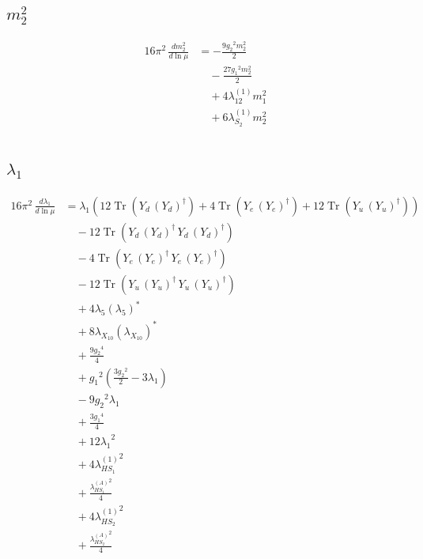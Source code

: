\documentclass[10pt,a4paper]{article}
\begin{document}
\subsection*{$m_2^2$}
\begin{align*}
16\pi^2\,\frac{d m_2^2}{d\ln\mu} &=-\frac{9 {g_2}^2 {m_2^2}}{2} \\
&\quad -\frac{27 {g_1}^2 {m_2^2}}{2} \\
&\quad +4 {\lambda_{12}^{(1)}} {m_1^2} \\
&\quad +6 {\lambda_{S_2}^{(1)}} {m_2^2} \\
\end{align*}
\subsection*{$\lambda_1$}
\begin{align*}
16\pi^2\,\frac{d \lambda_1}{d\ln\mu} &={\lambda_1} (12 \operatorname{Tr}\!\left({Y_d}\,\left({Y_d}\right)^{\dagger}\right)+4 \operatorname{Tr}\!\left({Y_e}\,\left({Y_e}\right)^{\dagger}\right)+12 \operatorname{Tr}\!\left({Y_u}\,\left({Y_u}\right)^{\dagger}\right)) \\
&\quad -12 \operatorname{Tr}\!\left({Y_d}\,\left({Y_d}\right)^{\dagger}\,{Y_d}\,\left({Y_d}\right)^{\dagger}\right) \\
&\quad -4 \operatorname{Tr}\!\left({Y_e}\,\left({Y_e}\right)^{\dagger}\,{Y_e}\,\left({Y_e}\right)^{\dagger}\right) \\
&\quad -12 \operatorname{Tr}\!\left({Y_u}\,\left({Y_u}\right)^{\dagger}\,{Y_u}\,\left({Y_u}\right)^{\dagger}\right) \\
&\quad +4 {\lambda_5} \left({\lambda_5}\right)^{*} \\
&\quad +8 {\lambda_{X_{10}}} \left({\lambda_{X_{10}}}\right)^{*} \\
&\quad +\frac{9 {g_2}^4}{4} \\
&\quad +{g_1}^2 \left(\frac{3 {g_2}^2}{2}-3 {\lambda_1}\right) \\
&\quad -9 {g_2}^2 {\lambda_1} \\
&\quad +\frac{3 {g_1}^4}{4} \\
&\quad +12 {\lambda_1}^2 \\
&\quad +4 {\lambda_{HS_1}^{(1)}}^2 \\
&\quad +\frac{{\lambda_{HS_1}^{(A)}}^2}{4} \\
&\quad +4 {\lambda_{HS_2}^{(1)}}^2 \\
&\quad +\frac{{\lambda_{HS_2}^{(A)}}^2}{4} \\
\end{align*}
\end{document}
